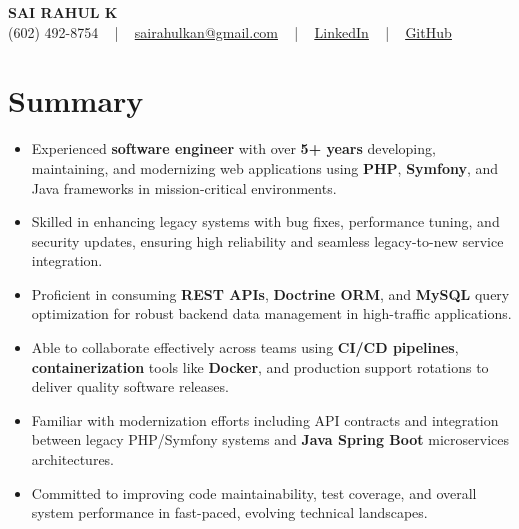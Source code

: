 \documentclass[letterpaper,11pt]{article}
\newcommand{\resumeItem}[1]{
  \item\footnotesize{
    {#1 \vspace{-2pt}}
  }
}
\newcommand{\resumeItemListStart}{\begin{itemize}[leftmargin=*]}
\newcommand{\resumeItemListEnd}{\end{itemize}\vspace{-5pt}}
\begin{document}
\begin{center}
    {\fontsize{14pt}{12pt}\selectfont \textbf{\MakeUppercase{Sai Rahul K}}}\\ \vspace{2pt}
    \fontsize{10pt}{12pt}\selectfont (602) 492-8754 ~ | ~ \href{mailto:sairahulkan@gmail.com}{sairahulkan@gmail.com} ~ | ~
    \href{https://www.linkedin.com/in/rq123/}{\color{blue}\underline{LinkedIn}} ~ | ~
    \href{https://github.com/kanrahuldo}{\color{blue}\underline{GitHub}}~
    \vspace{-8pt}
\end{center}

\section{Summary}
\fontsize{9pt}{10pt}\selectfont
\resumeItemListStart
    \resumeItem{Experienced \textbf{software engineer} with over \textbf{5+ years} developing, maintaining, and modernizing web applications using \textbf{PHP}, \textbf{Symfony}, and Java frameworks in mission-critical environments.} \vspace{-3pt}
    \resumeItem{Skilled in enhancing legacy systems with bug fixes, performance tuning, and security updates, ensuring high reliability and seamless legacy-to-new service integration.} \vspace{-3pt}
    \resumeItem{Proficient in consuming \textbf{REST APIs}, \textbf{Doctrine ORM}, and \textbf{MySQL} query optimization for robust backend data management in high-traffic applications.} \vspace{-3pt}
    \resumeItem{Able to collaborate effectively across teams using \textbf{CI/CD pipelines}, \textbf{containerization} tools like \textbf{Docker}, and production support rotations to deliver quality software releases.} \vspace{-3pt}
    \resumeItem{Familiar with modernization efforts including API contracts and integration between legacy PHP/Symfony systems and \textbf{Java Spring Boot} microservices architectures.} \vspace{-3pt}
    \resumeItem{Committed to improving code maintainability, test coverage, and overall system performance in fast-paced, evolving technical landscapes.}
\resumeItemListEnd
\vspace{-6pt}
\end{document}
